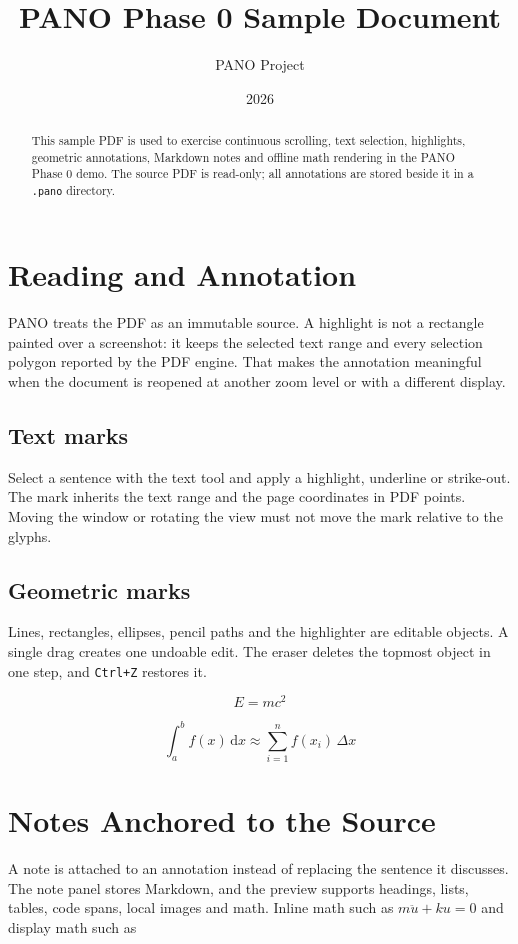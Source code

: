 \documentclass[11pt,a4paper]{article}
\title{\textbf{PANO Phase 0 Sample Document}}
\author{PANO Project}
\date{2026}
\begin{document}
\maketitle

\begin{abstract}
This sample PDF is used to exercise continuous scrolling, text selection, highlights,
geometric annotations, Markdown notes and offline math rendering in the PANO Phase 0 demo.
The source PDF is read-only; all annotations are stored beside it in a \texttt{.pano} directory.
\end{abstract}

\section{Reading and Annotation}
PANO treats the PDF as an immutable source. A highlight is not a rectangle painted over a
screenshot: it keeps the selected text range and every selection polygon reported by the PDF
engine. That makes the annotation meaningful when the document is reopened at another zoom
level or with a different display.

\subsection{Text marks}
Select a sentence with the text tool and apply a highlight, underline or strike-out. The mark
inherits the text range and the page coordinates in PDF points. Moving the window or rotating
the view must not move the mark relative to the glyphs.

\subsection{Geometric marks}
Lines, rectangles, ellipses, pencil paths and the highlighter are editable objects. A single
drag creates one undoable edit. The eraser deletes the topmost object in one step, and
\texttt{Ctrl+Z} restores it.

\begin{equation}
  E = mc^2
\end{equation}

\begin{equation}
  \int_a^b f(x)\,\mathrm{d}x \approx \sum_{i=1}^{n} f(x_i)\,\Delta x
\end{equation}

\section{Notes Anchored to the Source}
A note is attached to an annotation instead of replacing the sentence it discusses. The note
panel stores Markdown, and the preview supports headings, lists, tables, code spans, local
images and math. Inline math such as $m\ddot{u}+ku=0$ and display math such as
\end{document}
